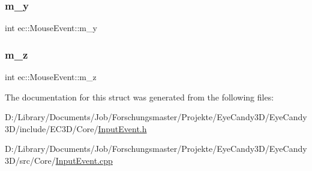 \subsubsection{\texorpdfstring{m\+\_\+y}{m\_y}}
{\footnotesize\ttfamily int ec\+::\+Mouse\+Event\+::m\+\_\+y}

\mbox{\label{structec_1_1_mouse_event_a6ba4ec5d26b3dbe8be4d57b4197bada2}} 
\subsubsection{\texorpdfstring{m\+\_\+z}{m\_z}}
{\footnotesize\ttfamily int ec\+::\+Mouse\+Event\+::m\+\_\+z}



The documentation for this struct was generated from the following files\+:\begin{DoxyCompactItemize}
\item 
D\+:/\+Library/\+Documents/\+Job/\+Forschungsmaster/\+Projekte/\+Eye\+Candy3\+D/\+Eye\+Candy3\+D/include/\+E\+C3\+D/\+Core/\mbox{\hyperlink{_input_event_8h}{Input\+Event.\+h}}\item 
D\+:/\+Library/\+Documents/\+Job/\+Forschungsmaster/\+Projekte/\+Eye\+Candy3\+D/\+Eye\+Candy3\+D/src/\+Core/\mbox{\hyperlink{_input_event_8cpp}{Input\+Event.\+cpp}}\end{DoxyCompactItemize}
